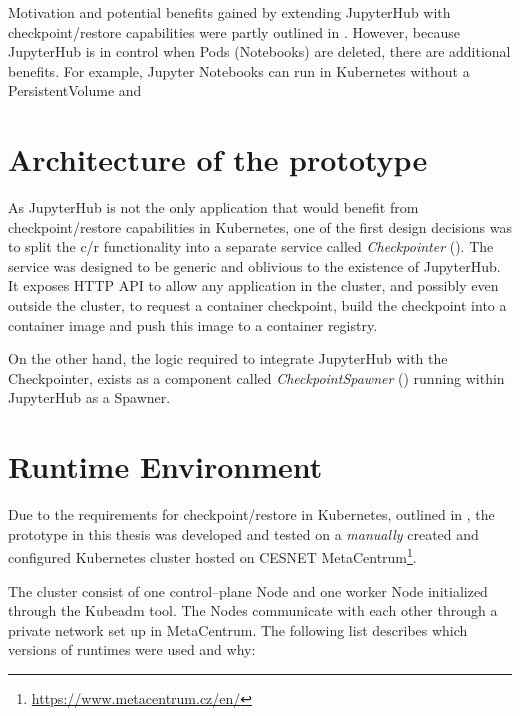 \documentclass[
  digital,     %
  oneside,     %
  nosansbold,  %
  nocolorbold, %
  lof,         %
  lot,         %
]{fithesis4}
\begin{document}
Motivation and potential benefits gained by extending JupyterHub with checkpoint/restore capabilities were partly outlined in . However, because JupyterHub is in control when Pods (Notebooks) are deleted, there are additional benefits. For example, Jupyter Notebooks can run in Kubernetes without a PersistentVolume and  

\section{Architecture of the prototype}
As JupyterHub is not the only application that would benefit from checkpoint/restore capabilities in Kubernetes, one of the first design decisions was to split the c/r functionality into a separate service called \emph{Checkpointer} (). The service was designed to be generic and oblivious to the existence of JupyterHub. It exposes HTTP API to allow any application in the cluster, and possibly even outside the cluster, to request a container checkpoint, build the checkpoint into a container image and push this image to a container registry.

On the other hand, the logic required to integrate JupyterHub with the Checkpointer, exists as a component called \emph{CheckpointSpawner} () running within JupyterHub as a Spawner.


\section{Runtime Environment}
Due to the requirements for checkpoint/restore in Kubernetes, outlined in , the prototype in this thesis was developed and tested on a \emph{manually} created and configured Kubernetes cluster hosted on CESNET MetaCentrum\footnote{\url{https://www.metacentrum.cz/en/}}. 

The cluster consist of one control--plane Node and one worker Node initialized through the Kubeadm tool. The Nodes communicate with each other through a private network set up in MetaCentrum. The following list describes which versions of runtimes were used and why:
\end{document}

